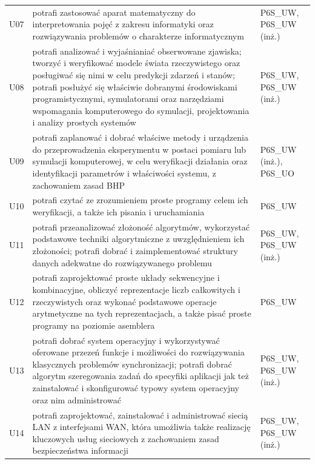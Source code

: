 \documentclass[12pt,a4paper]{article}
\begin{document}
{\begin{longtable}{m{1cm}m{9.5cm}m{3.9cm}}
\rowcolor{tableRowLight} U07 & potrafi zastosować aparat matematyczny do interpretowania pojęć z zakresu informatyki oraz rozwiązywania problemów o charakterze informatycznym & {\scriptsize P6S\_UW, P6S\_UW {\scriptsize (inż.)}} \\
\rowcolor{tableRowAlt} U08 & potrafi analizować i wyjaśnianiać obserwowane zjawiska; tworzyć i weryfikować modele świata rzeczywistego oraz posługiwać się nimi w celu predykcji zdarzeń i stanów; potrafi posłużyć się właściwie dobranymi środowiskami programistycznymi, symulatorami oraz narzędziami wspomagania komputerowego do symulacji, projektowania i analizy prostych systemów & {\scriptsize P6S\_UW, P6S\_UW {\scriptsize (inż.)}} \\
\rowcolor{tableRowLight} U09 & potrafi zaplanować i dobrać właściwe metody i urządzenia do przeprowadzenia eksperymentu w postaci pomiaru lub symulacji komputerowej, w celu weryfikacji działania oraz identyfikacji parametrów i właściwości systemu, z zachowaniem zasad BHP & {\scriptsize P6S\_UW {\scriptsize (inż.)}, P6S\_UO} \\
\rowcolor{tableRowAlt} U10 & potrafi czytać ze zrozumieniem proste programy celem ich weryfikacji, a także ich pisania i uruchamiania & {\scriptsize P6S\_UW} \\
\rowcolor{tableRowLight} U11 & potrafi przeanalizować złożoność algorytmów, wykorzystać podstawowe techniki algorytmiczne z uwzględnieniem ich złożoności; potrafi dobrać i zaimplementować struktury danych adekwatne do rozwiązywanego problemu & {\scriptsize P6S\_UW, P6S\_UW {\scriptsize (inż.)}} \\
\rowcolor{tableRowAlt} U12 & potrafi zaprojektować proste układy sekwencyjne i kombinacyjne, obliczyć reprezentacje liczb całkowitych i rzeczywistych oraz wykonać podstawowe operacje arytmetyczne na tych reprezentacjach, a także pisać proste programy na poziomie asemblera & {\scriptsize P6S\_UW} \\
\rowcolor{tableRowLight} U13 & potrafi dobrać system operacyjny i wykorzystywać oferowane przezeń funkcje i możliwości do rozwiązywania klasycznych problemów synchronizacji; potrafi dobrać algorytm szeregowania zadań do specyfiki aplikacji jak też zainstalować i skonfigurować typowy system operacyjny oraz nim administrować & {\scriptsize P6S\_UW, P6S\_UW {\scriptsize (inż.)}} \\
\rowcolor{tableRowAlt} U14 & potrafi zaprojektować, zainstalować i administrować siecią LAN z interfejsami WAN, która umożliwia także realizację kluczowych usług sieciowych z zachowaniem zasad bezpieczeństwa informacji & {\scriptsize P6S\_UW, P6S\_UW {\scriptsize (inż.)}} \\

\end{longtable}}
\end{document}
